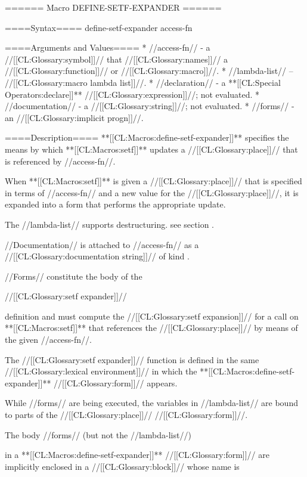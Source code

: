 ====== Macro DEFINE-SETF-EXPANDER ======

====Syntax====
\DefmacWithValuesNewline define-setf-expander {} {access-fn}

====Arguments and Values====
  * //access-fn// - a //[[CL:Glossary:symbol]]// that //[[CL:Glossary:names]]// a //[[CL:Glossary:function]]// or //[[CL:Glossary:macro]]//.
  * //lambda-list// -- //[[CL:Glossary:macro lambda list]]//.
  * //declaration// - a **[[CL:Special Operators:declare]]** //[[CL:Glossary:expression]]//; not evaluated.
  * //documentation// - a //[[CL:Glossary:string]]//; not evaluated.
  * //forms// - an //[[CL:Glossary:implicit progn]]//.

====Description====
**[[CL:Macros:define-setf-expander]]** specifies the means by which **[[CL:Macros:setf]]** updates a //[[CL:Glossary:place]]// that is referenced by //access-fn//.

When **[[CL:Macros:setf]]** is given a //[[CL:Glossary:place]]// that is specified in terms of //access-fn// and a new value for the //[[CL:Glossary:place]]//, it is expanded into a form that performs the appropriate update.

The //lambda-list// supports destructuring. see section {\secref\MacroLambdaLists}.

//Documentation// is attached to //access-fn// as a //[[CL:Glossary:documentation string]]// of kind .

//Forms// constitute the body of the

//[[CL:Glossary:setf expander]]//

definition and must compute the //[[CL:Glossary:setf expansion]]// for a call on **[[CL:Macros:setf]]** that references the //[[CL:Glossary:place]]// by means of the given //access-fn//.

The //[[CL:Glossary:setf expander]]// function is defined in the same //[[CL:Glossary:lexical environment]]// in which the **[[CL:Macros:define-setf-expander]]** //[[CL:Glossary:form]]// appears.

While //forms// are being executed, the variables in //lambda-list// are bound to parts of the //[[CL:Glossary:place]]// //[[CL:Glossary:form]]//.

The body //forms// (but not the //lambda-list//)

in a **[[CL:Macros:define-setf-expander]]** //[[CL:Glossary:form]]// are implicitly enclosed in a //[[CL:Glossary:block]]// whose name is

